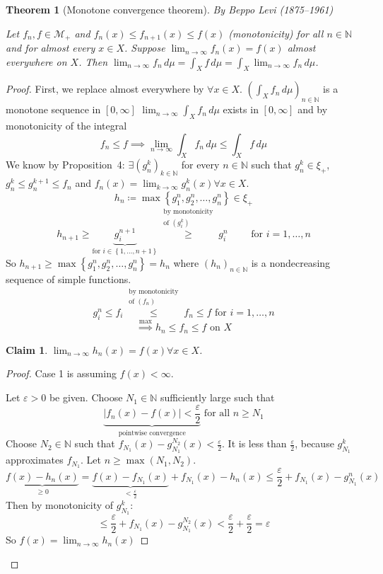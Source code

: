 \documentclass{article}
\newtheorem{theorem}{Theorem}  \numberwithin{theorem}{section}
\newtheorem*{claim}{Claim}%
\newcommand{\set}[1]{\left\{#1\right\}}
\newcommand{\card}[1]{\left|#1\right|}
\begin{document}
\begin{theorem}[Monotone convergence theorem]  %
  By Beppo Levi (1875--1961)

  Let $f_n, f \in \mathcal M_+$ and $f_n(x) \leq f_{n+1}(x) \leq f(x)$ (monotonicity) for all $n \in \mathbb N$ and for almost every $x \in X$.
  Suppose $\lim_{n\to\infty} f_n(x) = f(x)$ almost everywhere on $X$.
  Then $\lim_{n\to\infty} f_n \, d\mu = \int_X f \, d\mu = \int_X \lim_{n\to\infty} f_n \, d\mu$.
\end{theorem}
\begin{proof}
  First, we replace almost everywhere by $\forall x \in X$.
  $\left(\int_X f_n \, d\mu\right)_{n\in\mathbb N}$ is a monotone sequence in $[0,\infty]$
  $\lim_{n\to\infty} \int_X f_n \, d\mu$ exists in $[0,\infty]$ and by monotonicity of the integral
  \[ f_n \leq f \implies \lim_{n\to\infty} \int_X f_n \, d\mu \leq \int_X f \, d\mu \]
  We know by Proposition~4: $\exists (g_n^k)_{k \in \mathbb N}$ for every $n \in \mathbb N$
  such that $g_n^k \in \xi_+$, $g_n^k \leq g_n^{k+1} \leq f_n$ and $f_n(x) = \lim_{k\to\infty} g_n^k(x) \forall x \in X$.
  \[ h_n \coloneqq \max\set{g_1^n, g_2^n, \ldots, g_n^n} \in \xi_+ \]
  \[ h_{n+1} \geq \underbrace{g_i^{n+1}}_{\text{for } i \in \set{1,\ldots,n+1}} \stackrel{\substack{\text{by monotonicity} \\ \text{of } (g_i^k)}}{\geq} g_i^n \qquad \text{ for } i = 1,\ldots,n \]
  So $h_{n+1} \geq \max\set{g_1^n, g_2^n, \ldots, g_n^n} = h_n$ where $(h_n)_{n \in \mathbb N}$ is a nondecreasing sequence of simple functions.
  \[ g_i^n \leq f_i \stackrel{\substack{\text{by monotonicity} \\ \text{of } (f_n)}}{\leq} f_n \leq f \text{ for } i = 1,\ldots,n \]
  \[ \stackrel{\max}{\implies} h_n \leq f_n \leq f \text{ on } X \]

  \begin{claim}$\lim_{n\to\infty} h_n(x) = f(x) \forall x \in X$.\end{claim}
  \begin{proof}
    Case 1 is assuming $f(x) < \infty$.

    Let $\varepsilon > 0$ be given. Choose $N_1 \in \mathbb N$ sufficiently large such that
    \[ \underbrace{\card{f_n(x) - f(x)} < \frac{\varepsilon}{2}}_{\text{pointwise convergence}} \text{ for all } n \geq N_1 \]
    Choose $N_2 \in \mathbb N$ such that $f_{N_1}(x) - g_{N_1}^{N_2}(x) < \frac{\varepsilon}{2}$.
    It is less than $\frac{\varepsilon}{2}$, because $g_{N_1}^k$ approximates $f_{N_1}$.
    Let $n \geq \max(N_1, N_2)$.
    \[ \underbrace{f(x) - h_n(x)}_{\geq 0} = \underbrace{f(x) - f_{N_1}(x)}_ {< \frac\varepsilon2} + f_{N_1}(x) - h_n(x) \leq \frac\varepsilon2 + f_{N_1}(x) - g^n_{N_1}(x) \]
    Then by monotonicity of $g_{N_1}^k$:
    \[ \leq \frac\varepsilon2 + f_{N_1}(x) - g_{N_1}^{N_2}(x) < \frac\varepsilon2 + \frac\varepsilon2 = \varepsilon \]
    So $f(x) = \lim_{n\to\infty} h_n(x)$


\end{proof}
\end{proof}
\end{document}
